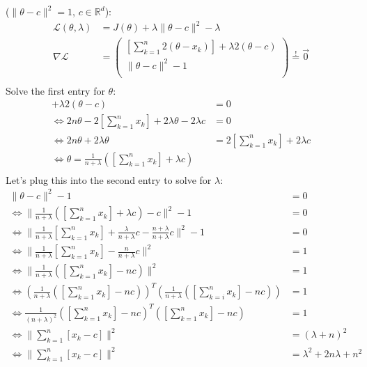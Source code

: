 \documentclass[10pt,a4paper]{article}
\begin{document}
\begin{enumerate}[(a)]
($\|\theta-c\|^2 = 1$, $c \in \mathbb{R}^d$):
\begin{align*}
    \mathcal{L}(\theta,\lambda) &= J(\theta) + \lambda \|\theta - c\|^2 - \lambda \\
    \nabla\mathcal{L} &= \left(
        \begin{array}{c}
            [\sum_{k = 1}^{n} 2(\theta-x_k)] + \lambda 2(\theta - c)\\
            \|\theta - c\|^2 - 1\\
        \end{array}
    \right) \overset{!}{=} \vec{0} \\
\end{align*}
Solve the first entry for $\theta$:
\begin{align*}
    [\sum_{k = 1}^{n} 2(\theta-x_k)] + \lambda 2(\theta - c) &= 0 \\
    \Leftrightarrow 2n\theta - 2 [\sum_{k = 1}^{n}x_k] + 2\lambda \theta - 2\lambda c &= 0 \\
    \Leftrightarrow 2n\theta + 2\lambda \theta &= 2 [\sum_{k = 1}^{n}x_k] + 2\lambda c \\
    \Leftrightarrow \theta = \frac{1}{n+\lambda} ([\sum_{k = 1}^{n}x_k] + \lambda c)\\ 
\end{align*}
Let's plug this into the second entry to solve for $\lambda$:
\begin{align*}
    \|\theta - c\|^2 - 1 &= 0 \\
    \Leftrightarrow \| \frac{1}{n+\lambda} ([\sum_{k = 1}^{n}x_k] + \lambda c) - c\|^2 - 1 &= 0\\
    \Leftrightarrow \| \frac{1}{n+\lambda} [\sum_{k = 1}^{n}x_k] + \frac{\lambda}{n+\lambda} c - \frac{n+\lambda}{n+\lambda}c\|^2 - 1 &= 0\\
    \Leftrightarrow \| \frac{1}{n+\lambda} [\sum_{k = 1}^{n}x_k] - \frac{n}{n+\lambda} c\|^2 &= 1\\
    \Leftrightarrow \| \frac{1}{n+\lambda} ([\sum_{k = 1}^{n}x_k] - n c)\|^2 &= 1\\
    \Leftrightarrow  (\frac{1}{n+\lambda} ([\sum_{k = 1}^{n}x_k] - n c))^T (\frac{1}{n+\lambda} ([\sum_{k = i}^{n}x_k] - n c)) &= 1\\
    \Leftrightarrow \frac{1}{(n+\lambda)^2}([\sum_{k = 1}^{n}x_k] - n c)^T ([\sum_{k = 1}^{n}x_k] - n c) &= 1\\
    \Leftrightarrow \|\sum_{k = 1}^{n}[x_k - c]\|^2 &= (\lambda + n)^2\\
    \Leftrightarrow \|\sum_{k = 1}^{n}[x_k - c]\|^2 &= \lambda^2 + 2n\lambda +n^2\\

\end{align*}
\end{enumerate}
\end{document}
